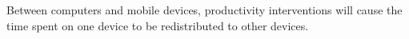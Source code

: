 \begin{hyp} \label{hyp:across}
Between computers and mobile devices, productivity interventions will cause the time spent on one device to be redistributed to other devices.
\end{hyp}






